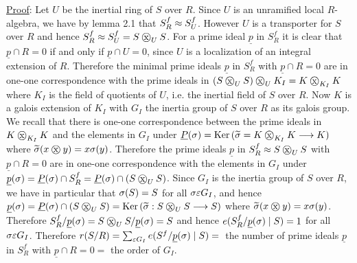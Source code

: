 \uline{Proof}: Let $U$ be the inertial ring of $S$ over $R$. Since $U$ is an unramified local $R$-algebra, we have by lemma 2.1 that $S_R^f\approx S_U^f$. However $U$ is a transporter for $S$ over $R$ and hence $S_R^f\handwritten{\approx}S_U^f=S\mathbin{\ooalign{\hfil$\mathrm{x}$\hfil\cr\hfil$\handwritten{\bigcirc}$\hfil\cr}}_U S$. For a prime ideal $\underline p$ in $S_R^f$ it is clear that $\underline p\cap R=0$ if and only if $\underline p\cap U=0$, since $U$ is a localization of an integral extension of $R$. Therefore the minimal prime ideals $\underline p$ in $S_R^f$ with $\underline p\cap R=0$ are in one-one correspondence with the prime ideals in $(S\mathbin{\ooalign{\hfil$\mathrm{x}$\hfil\cr\hfil$\handwritten{\bigcirc}$\hfil\cr}}_U S)\mathbin{\ooalign{\hfil$\mathrm{x}$\hfil\cr\hfil$\handwritten{\bigcirc}$\hfil\cr}}_U K_I=K\mathbin{\ooalign{\hfil$\mathrm{x}$\hfil\cr\hfil$\handwritten{\bigcirc}$\hfil\cr}}_{K_I}K$ where $K_I$ is the field of quotients of $U$, i.e. the inertial field of $S$ over $R$. Now $K$ is a galois extension of $K_I$ with $G_I$ the inertia group of $S$ over $R$ as its galois group. We recall that there is one-one correspondence between the prime ideals in $K\mathbin{\ooalign{\hfil$\mathrm{x}$\hfil\cr\hfil$\handwritten{\bigcirc}$\hfil\cr}}_{K_I}K$ and the elements in $G_I$ under $\underline P(\handwritten{\sigma})=\mathrm{Ker}\,(\handwritten{\widetilde\sigma}=K\mathbin{\ooalign{\hfil$\mathrm{x}$\hfil\cr\hfil$\handwritten{\bigcirc}$\hfil\cr}}_{K_I}K\longrightarrow K)$ where $\handwritten{\widetilde\sigma}(x\mathbin{\ooalign{\hfil$\mathrm{x}$\hfil\cr\hfil$\handwritten{\bigcirc}$\hfil\cr}} y)=x\handwritten{\sigma}(y)$. Therefore the prime ideals $\underline p$ in $S_R^f\handwritten{\approx}S\mathbin{\ooalign{\hfil$\mathrm{x}$\hfil\cr\hfil$\handwritten{\bigcirc}$\hfil\cr}}_U S$ with $\underline p\cap R=0$ are in one-one correspondence with the elements in $G_I$ under $\underline p(\handwritten{\sigma})=\underline P(\handwritten{\sigma})\cap S_R^f=\underline P(\handwritten{\sigma})\cap(S\mathbin{\ooalign{\hfil$\mathrm{x}$\hfil\cr\hfil$\handwritten{\bigcirc}$\hfil\cr}}_U S)$. Since $G_I$ is the inertia group of $S$ over $R$, we have in particular that $\sigma(S)=S$ for all $\sigma \varepsilon G_I$, and hence $\underline p(\handwritten{\sigma})=\underline P(\handwritten{\sigma})\cap(S\mathbin{\ooalign{\hfil$\mathrm{x}$\hfil\cr\hfil$\handwritten{\bigcirc}$\hfil\cr}}_U S)=\mathrm{Ker}\,(\handwritten{\widetilde\sigma}:S\mathbin{\ooalign{\hfil$\mathrm{x}$\hfil\cr\hfil$\handwritten{\bigcirc}$\hfil\cr}}_U S\longrightarrow S)$ where $\handwritten{\widetilde\sigma}(x\mathbin{\ooalign{\hfil$\mathrm{x}$\hfil\cr\hfil$\handwritten{\bigcirc}$\hfil\cr}} y)=x\handwritten{\sigma}(y)$. Therefore $S_R^f/\underline p(\handwritten{\sigma})=S\mathbin{\ooalign{\hfil$\mathrm{x}$\hfil\cr\hfil$\handwritten{\bigcirc}$\hfil\cr}}_U S/\underline p(\handwritten{\sigma})=S$ and hence $e(S_R^f/\underline p(\sigma)\mid S)=1$ for all $\sigma \varepsilon G_I$. Therefore $r(S/R)=\sum_{\varepsilon G_I}e(S^f/\underline p(\sigma)\mid S)={}$ the number of prime ideals $\underline p$ in $S_R^f$ with $\underline p\cap R=0={}$ the order of $G_I$.

